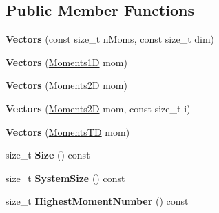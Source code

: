 \subsection*{Public Member Functions}
\begin{DoxyCompactItemize}
\item 
{\bfseries Vectors} (const size\+\_\+t n\+Moms, const size\+\_\+t dim)\hypertarget{classchebyshev_1_1_vectors_a47bceab1fdf23555a7da246983a799d8}{}\label{classchebyshev_1_1_vectors_a47bceab1fdf23555a7da246983a799d8}

\item 
{\bfseries Vectors} (\hyperlink{classchebyshev_1_1_moments1_d}{Moments1D} mom)\hypertarget{classchebyshev_1_1_vectors_a35d85ed43200417dea2e698c09766a43}{}\label{classchebyshev_1_1_vectors_a35d85ed43200417dea2e698c09766a43}

\item 
{\bfseries Vectors} (\hyperlink{classchebyshev_1_1_moments2_d}{Moments2D} mom)\hypertarget{classchebyshev_1_1_vectors_aa11abf4e8251b6a9b69d56191a653844}{}\label{classchebyshev_1_1_vectors_aa11abf4e8251b6a9b69d56191a653844}

\item 
{\bfseries Vectors} (\hyperlink{classchebyshev_1_1_moments2_d}{Moments2D} mom, const size\+\_\+t i)\hypertarget{classchebyshev_1_1_vectors_a9cee99d5d80da73abeec40f96568ade1}{}\label{classchebyshev_1_1_vectors_a9cee99d5d80da73abeec40f96568ade1}

\item 
{\bfseries Vectors} (\hyperlink{classchebyshev_1_1_moments_t_d}{Moments\+TD} mom)\hypertarget{classchebyshev_1_1_vectors_ad922ad16003b2526c71898b122688b65}{}\label{classchebyshev_1_1_vectors_ad922ad16003b2526c71898b122688b65}

\item 
size\+\_\+t {\bfseries Size} () const \hypertarget{classchebyshev_1_1_vectors_a30dc46a183c087fac30a3bc4d78b1094}{}\label{classchebyshev_1_1_vectors_a30dc46a183c087fac30a3bc4d78b1094}

\item 
size\+\_\+t {\bfseries System\+Size} () const \hypertarget{classchebyshev_1_1_vectors_a23d0d7c8fba9f9819d3aef9b0d9d9163}{}\label{classchebyshev_1_1_vectors_a23d0d7c8fba9f9819d3aef9b0d9d9163}

\item 
size\+\_\+t {\bfseries Highest\+Moment\+Number} () const \hypertarget{classchebyshev_1_1_vectors_a08aea691c50843f1a797cf09b624a9e2}{}\label{classchebyshev_1_1_vectors_a08aea691c50843f1a797cf09b624a9e2}


\end{DoxyCompactItemize}
